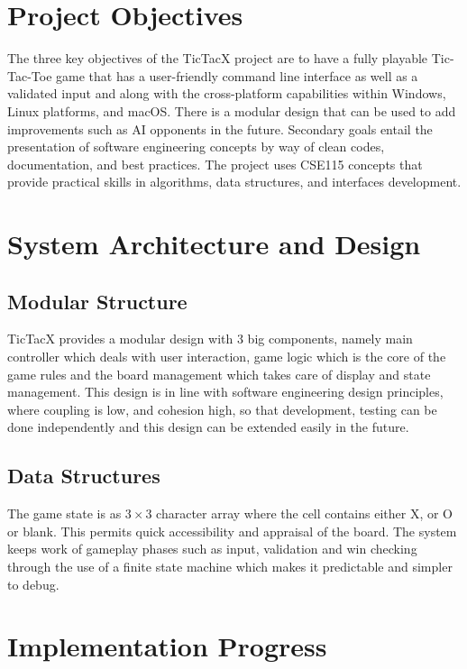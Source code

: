 \documentclass[11pt,a4paper,twocolumn]{article}
\begin{document}
\section{Project Objectives}

The three key objectives of the TicTacX project are to have a fully playable Tic-Tac-Toe game that has a user-friendly command line interface as well as a validated input and along with the cross-platform capabilities within Windows, Linux platforms, and macOS. There is a modular design that can be used to add improvements such as AI opponents in the future. Secondary goals entail the presentation of software engineering concepts by way of clean codes, documentation, and best practices. The project uses CSE115 concepts that provide practical skills in algorithms, data structures, and interfaces development.

\section{System Architecture and Design}

\subsection{Modular Structure}

TicTacX provides a modular design with 3 big components, namely main controller which deals with user interaction, game logic which is the core of the game rules and the board management which takes care of display and state management. This design is in line with software engineering design principles, where coupling is low, and cohesion high, so that development, testing can be done independently and this design can be extended easily in the future.

\subsection{Data Structures}

The game state is as $3 \times 3$ character array where the cell contains either X, or O or blank. This permits quick accessibility and appraisal of the board. The system keeps work of gameplay phases such as input, validation and win checking through the use of a finite state machine which makes it predictable and simpler to debug.

\section{Implementation Progress}
\end{document}
